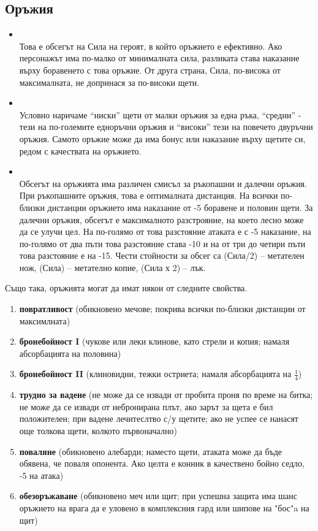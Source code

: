 \subsection{Оръжия}
\begin{itemize}
\item {} \\
Това е обсегът на Сила на героят, в който оръжието е ефективно.
Ако персонажът има по-малко от минималната сила, разликата става наказание върху боравенето с това оръжие.
От друга страна, Сила, по-висока от максималната, не допринася за по-високи щети.
\item {} \\
Условно наричаме “ниски” щети от малки оръжия за една ръка, “средни” - тези на по-големите
едноръчни оръжия и “високи” тези на повечето двуръчни оръжия.
Самото оръжие може да има бонус или наказание върху щетите си, редом с качествата на оръжието.
\item {} \\
Обсегът на оръжията има различен смисъл за ръкопашни и далечни оръжия.
При ръкопашните оръжия, това е оптималната дистанция.
На всички по-близки дистанции оръжието има наказание от -5 боравене и половин щети.
За далечни оръжия, обсегът е максималното разстрояние, на което лесно може да се улучи цел.
На по-голямо от това разстояние атаката е с -5 наказание, на по-голямо от два пъти това разстояние става -10 и на от три до четири пъти това разстояние е на -15.
Чести стойности за обсег са (Сила/2) – метателен нож, (Сила) – метателно копие, (Сила х 2) – лък.
\end{itemize}

Също така, оръжията могат да имат някои от следните свойства.
\begin{enumerate}
\item{\textbf{повратливост} (обикновено мечове; покрива всички по-близки дистанции от максимлната)}
\item{\textbf{бронебойност I} (чукове или леки клинове, като стрели и копия; намаля абсорбацията на половина)}
\item{\textbf{бронебойност II} (клиновидни, тежки остриета; намаля абсорбацията на $\frac1 4$)}
\item{\textbf{трудно за вадене} (не може да се извади от пробита проня по време на битка; не може да се извади от небронирана плът, ако зарът за щета е бил положителен; при вадене лечитеслтво с/у щетите; ако не успее се  нанасят още толкова щети, колкото първоначално)}
\item{\textbf{поваляне} (обикновено алебарди; наместо щети, атаката може да бъде обявена, че поваля опонента. Ако целта е конник в качествено бойно седло, -5 на атака)}
\item{\textbf{обезоръжаване} (обикновено меч или щит; при успешна защита има шанс оръжието на врага да е уловено в комплексния гард или шипове на "бос"a на щит)}
\end{enumerate}


